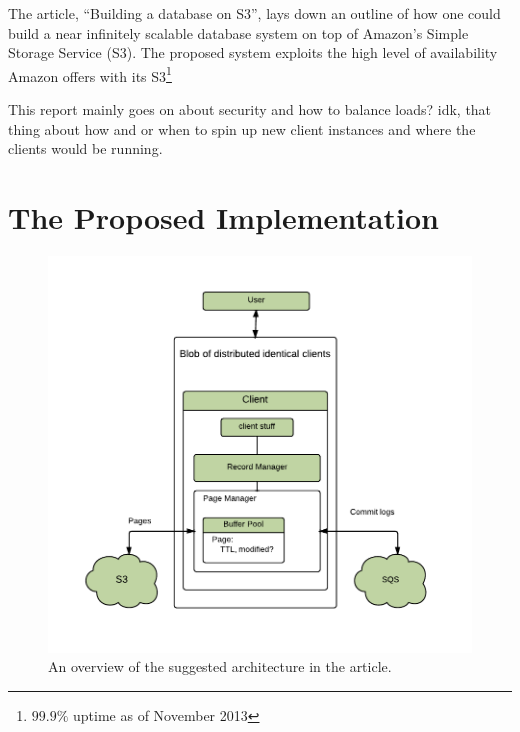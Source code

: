 \documentclass[11pt]{article}
\begin{document}
The article, ``Building a database on S3'', lays down an outline of how one could build a near infinitely scalable database system on top of Amazon's Simple Storage Service (S3).
The proposed system exploits the high level of availability Amazon offers with its S3\footnote{$99.9\%$ uptime as of November 2013}

This report mainly goes on about security and how to balance loads? idk, that thing about how and or when to spin up new client instances and where the clients would be running.

\section{The Proposed Implementation}
\begin{figure}[H]
	\begin{center}
		\includegraphics{img/proposed-architecture.pdf}
		\caption{An overview of the suggested architecture in the article.}
		\label{figure:proposed-architecture}
	\end{center}
\end{figure}
\end{document}
